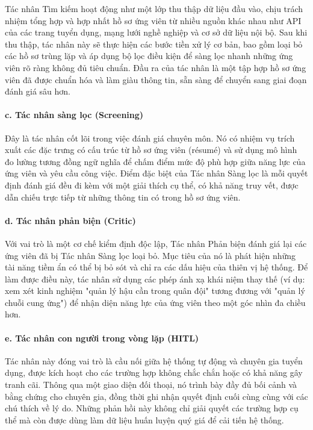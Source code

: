 \documentclass{article}
\begin{document}
\begin{itemize}[topsep=0pt, itemsep=4pt, leftmargin=40pt]
Tác nhân Tìm kiếm hoạt động như một lớp thu thập dữ liệu đầu vào, chịu trách nhiệm tổng hợp và hợp nhất hồ sơ ứng viên từ nhiều nguồn khác nhau như API của các trang tuyển dụng, mạng lưới nghề nghiệp và cơ sở dữ liệu nội bộ. Sau khi thu thập, tác nhân này sẽ thực hiện các bước tiền xử lý cơ bản, bao gồm loại bỏ các hồ sơ trùng lặp và áp dụng bộ lọc điều kiện để sàng lọc nhanh những ứng viên rõ ràng không đủ tiêu chuẩn. Đầu ra của tác nhân là một tập hợp hồ sơ ứng viên đã được chuẩn hóa và làm giàu thông tin, sẵn sàng để chuyển sang giai đoạn đánh giá sâu hơn.

\paragraph{c. Tác nhân sàng lọc (Screening)}

Đây là tác nhân cốt lõi trong việc đánh giá chuyên môn. Nó có nhiệm vụ trích xuất các đặc trưng có cấu trúc từ hồ sơ ứng viên (résumé) và sử dụng mô hình đo lường tương đồng ngữ nghĩa để chấm điểm mức độ phù hợp giữa năng lực của ứng viên và yêu cầu công việc. Điểm đặc biệt của Tác nhân Sàng lọc là mỗi quyết định đánh giá đều đi kèm với một giải thích cụ thể, có khả năng truy vết, được dẫn chiếu trực tiếp từ những thông tin có trong hồ sơ ứng viên.

\paragraph{d. Tác nhân phản biện (Critic)}

Với vai trò là một cơ chế kiểm định độc lập, Tác nhân Phản biện đánh giá lại các ứng viên đã bị Tác nhân Sàng lọc loại bỏ. Mục tiêu của nó là phát hiện những tài năng tiềm ẩn có thể bị bỏ sót và chỉ ra các dấu hiệu của thiên vị hệ thống. Để làm được điều này, tác nhân sử dụng các phép ánh xạ khái niệm thay thế (ví dụ: xem xét kinh nghiệm "quản lý hậu cần trong quân đội" tương đương với "quản lý chuỗi cung ứng") để nhận diện năng lực của ứng viên theo một góc nhìn đa chiều hơn.

\paragraph{e. Tác nhân con người trong vòng lặp (HITL)}

Tác nhân này đóng vai trò là cầu nối giữa hệ thống tự động và chuyên gia tuyển dụng, được kích hoạt cho các trường hợp không chắc chắn hoặc có khả năng gây tranh cãi. Thông qua một giao diện đối thoại, nó trình bày đầy đủ bối cảnh và bằng chứng cho chuyên gia, đồng thời ghi nhận quyết định cuối cùng cùng với các chú thích về lý do. Những phản hồi này không chỉ giải quyết các trường hợp cụ thể mà còn được dùng làm dữ liệu huấn luyện quý giá để cải tiến hệ thống.


\end{itemize}
\end{document}
